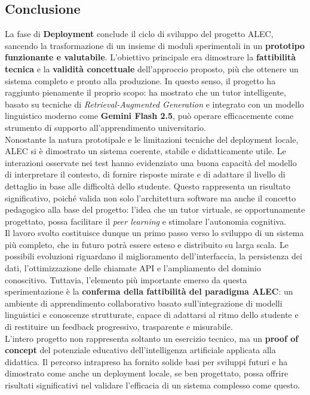 \documentclass[a4paper,9pt]{article}
\begin{document}
\subsection{Conclusione}
La fase di \textbf{Deployment} conclude il ciclo di sviluppo del progetto ALEC, sancendo la trasformazione di un insieme di moduli sperimentali in un \textbf{prototipo funzionante e valutabile}.  
L’obiettivo principale era dimostrare la \textbf{fattibilità tecnica} e la \textbf{validità concettuale} dell’approccio proposto, più che ottenere un sistema completo e pronto alla produzione.  
In questo senso, il progetto ha raggiunto pienamente il proprio scopo: ha mostrato che un tutor intelligente, basato su tecniche di \textit{Retrieval-Augmented Generation} e integrato con un modello linguistico moderno come \textbf{Gemini Flash 2.5}, può operare efficacemente come strumento di supporto all’apprendimento universitario.\\
Nonostante la natura prototipale e le limitazioni tecniche del deployment locale, ALEC si è dimostrato un sistema coerente, stabile e didatticamente utile.  
Le interazioni osservate nei test hanno evidenziato una buona capacità del modello di interpretare il contesto, di fornire risposte mirate e di adattare il livello di dettaglio in base alle difficoltà dello studente.  
Questo rappresenta un risultato significativo, poiché valida non solo l’architettura software ma anche il concetto pedagogico alla base del progetto: l’idea che un tutor virtuale, se opportunamente progettato, possa facilitare il \textit{peer learning} e stimolare l’autonomia cognitiva.\\
Il lavoro svolto costituisce dunque un primo passo verso lo sviluppo di un sistema più completo, che in futuro potrà essere esteso e distribuito su larga scala.  
Le possibili evoluzioni riguardano il miglioramento dell’interfaccia, la persistenza dei dati, l’ottimizzazione delle chiamate API e l’ampliamento del dominio conoscitivo.  
Tuttavia, l’elemento più importante emerso da questa sperimentazione è la \textbf{conferma della fattibilità del paradigma ALEC}: un ambiente di apprendimento collaborativo basato sull’integrazione di modelli linguistici e conoscenze strutturate, capace di adattarsi al ritmo dello studente e di restituire un feedback progressivo, trasparente e misurabile.\\
L'intero progetto non rappresenta soltanto un esercizio tecnico, ma un \textbf{proof of concept} del potenziale educativo dell’intelligenza artificiale applicata alla didattica.  
Il percorso intrapreso ha fornito solide basi per sviluppi futuri e ha dimostrato come anche un deployment locale, se ben progettato, possa offrire risultati significativi nel validare l’efficacia di un sistema complesso come questo.
\end{document}
